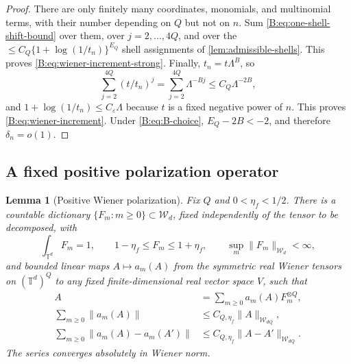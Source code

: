 \documentclass[11pt]{article}
\newtheorem{lemma}[lemma]{Lemma}
\newcommand{\Torus}{\mathbb{T}}
\newcommand{\cW}{\mathcal{W}}
\newcommand{\norm}[1]{\lVert #1\rVert}
\begin{document}
\begin{proof}
There are only finitely many coordinates, monomials, and multinomial terms,
with their number depending on \(Q\) but not on \(n\).  Sum
\eqref{B:eq:one-shell-shift-bound} over them, over \(j=2,\ldots,4Q\), and over
the \(\le C_Q\{1+\log(1/t_n)\}^{E_Q}\) shell assignments of
\cref{lem:admissible-shells}.  This proves
\eqref{B:eq:wiener-increment-strong}.  Finally,
\(t_n=t\Lambda^B\), so
\[
 \sum_{j=2}^{4Q}(t/t_n)^j
 =\sum_{j=2}^{4Q}\Lambda^{-Bj}
 \le C_Q\Lambda^{-2B},
\]
and \(1+\log(1/t_n)\le C_\varepsilon\Lambda\) because \(t\) is a fixed
negative power of \(n\).  This proves \eqref{B:eq:wiener-increment}.  Under
\eqref{B:eq:B-choice}, \(E_Q-2B<-2\), and therefore \(\delta_n=o(1)\).
\end{proof}

\subsection{A fixed positive polarization operator}

\begin{lemma}[Positive Wiener polarization]
\label{B:lem:positive-polarization}
Fix \(Q\) and \(0<\eta_f<1/2\).  There is a countable dictionary
\(\{F_m:m\ge0\}\subset\cW_d\), fixed independently of the tensor to be
decomposed, with
\begin{equation}
 \int_{\Torus^d}F_m=1,
 \qquad
 1-\eta_f\le F_m\le1+\eta_f,
 \qquad
 \sup_m\norm{F_m}_{\cW_d}<\infty,
 \label{B:eq:positive-atoms}
\end{equation}
and bounded linear maps
\(A\mapsto a_m(A)\) from the symmetric real Wiener tensors on
\((\Torus^d)^Q\) to any fixed finite-dimensional real vector space \(V\),
such that
\begin{align}
 A&=\sum_{m\ge0}a_m(A)F_m^{\otimes Q},
 \label{B:eq:polarization-expansion}\\
 \sum_{m\ge0}\norm{a_m(A)}
 &\le C_{Q,\eta_f}\norm A_{\cW_{dQ}},
 \label{B:eq:polarization-bound}\\
 \sum_{m\ge0}\norm{a_m(A)-a_m(A')}
 &\le C_{Q,\eta_f}\norm{A-A'}_{\cW_{dQ}}.
 \label{B:eq:polarization-lipschitz}
\end{align}
The series converges absolutely in Wiener norm.
\end{lemma}
\end{document}
